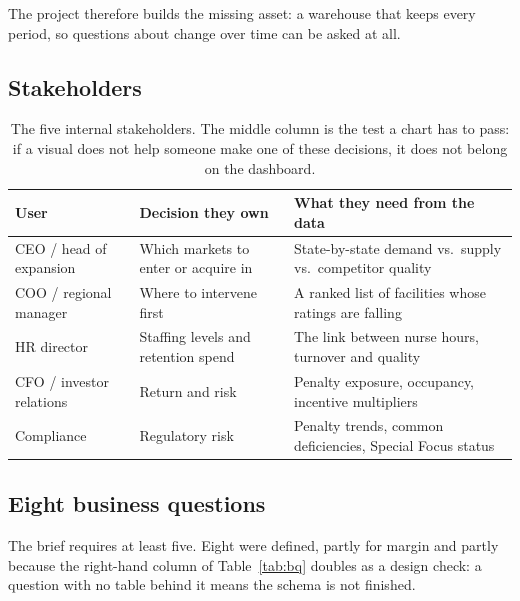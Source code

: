 \documentclass[11pt,a4paper]{article}
\newcommand{\sansall}{\sffamily}
\begin{document}
The project therefore builds the missing asset: a warehouse that keeps every
period, so questions about change over time can be asked at all.

\subsection{Stakeholders}

\begin{table}[htbp]\centering\small
\begin{tabular}{L{3.3cm} L{5.6cm} L{6.4cm}}
\toprule
\sansall\bfseries User & \sansall\bfseries Decision they own &
\sansall\bfseries What they need from the data \\
\midrule
CEO / head of expansion & Which markets to enter or acquire in &
  State-by-state demand vs.\ supply vs.\ competitor quality \\
\addlinespace
COO / regional manager & Where to intervene first &
  A ranked list of facilities whose ratings are falling \\
\addlinespace
HR director & Staffing levels and retention spend &
  The link between nurse hours, turnover and quality \\
\addlinespace
CFO / investor relations & Return and risk &
  Penalty exposure, occupancy, incentive multipliers \\
\addlinespace
Compliance & Regulatory risk &
  Penalty trends, common deficiencies, Special Focus status \\
\bottomrule
\end{tabular}
\caption{The five internal stakeholders. The middle column is the test a chart
has to pass: if a visual does not help someone make one of these decisions, it
does not belong on the dashboard.}
\end{table}

\subsection{Eight business questions}

The brief requires at least five. Eight were defined, partly for margin and
partly because the right-hand column of Table~\ref{tab:bq} doubles as a design
check: a question with no table behind it means the schema is not finished.
\end{document}
